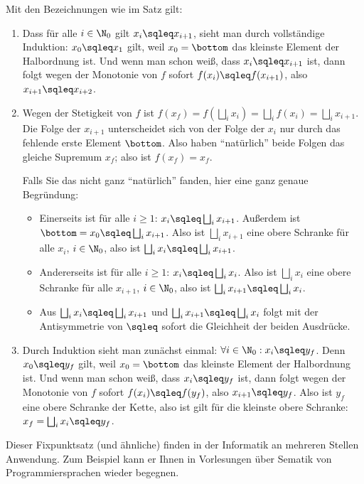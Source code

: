 \begin{beweis}
  Mit den Bezeichnungen wie im Satz gilt:
  \begin{enumerate}
  \item Dass für alle $i\in\N_0$ gilt $x_i\sqleq x_{i+1}$, sieht man
    durch vollständige Induktion: $x_0\sqleq x_1$ gilt, weil
    $x_0=\bottom$ das kleinste Element der Halbordnung ist. Und wenn
    man schon weiß, dass $x_i\sqleq x_{i+1}$ ist, dann folgt wegen der
    Monotonie von $f$ sofort $f(x_i)\sqleq f(x_{i+1})$, also
    $x_{i+1}\sqleq x_{i+2}$.
  \item Wegen der Stetigkeit von $f$ ist $f(x_f)= f(\bigsqcup_i x_i)
    =\bigsqcup_i f(x_i) = \bigsqcup_i x_{i+1}$. Die Folge der $x_{i+1}$
    unterscheidet sich von der Folge der $x_i$ nur durch das fehlende
    erste Element $\bottom$. Also haben "`natürlich"' beide Folgen das
    gleiche Supremum $x_f$; also ist $f(x_f)=x_f$.

    Falls Sie das nicht ganz "`natürlich"' fanden, hier eine ganz
    genaue Begründung:
    \begin{itemize}
    \item Einerseits ist für alle $i\geq 1$: $x_i\sqleq \bigsqcup_i
      x_{i+1}$. Außerdem ist $\bottom=x_0\sqleq \bigsqcup_i
      x_{i+1}$. Also ist $\bigsqcup_i x_{i+1}$ eine obere Schranke für
      alle $x_i$, $i\in\N_0$, also ist $\bigsqcup_i x_i\sqleq
      \bigsqcup_i x_{i+1}$.
    \item Andererseits ist für alle $i\geq 1$: $x_i\sqleq \bigsqcup_i
      x_i$. Also ist $\bigsqcup_i x_i$ eine obere Schranke für alle
      $x_{i+1}$, $i\in\N_0$, also ist $\bigsqcup_i x_{i+1}\sqleq
      \bigsqcup_i x_i$.
    \item Aus $\bigsqcup_i x_i\sqleq \bigsqcup_i x_{i+1}$ und
      $\bigsqcup_i x_{i+1}\sqleq \bigsqcup_i x_i$ folgt mit der
      Antisymmetrie von $\sqleq$ sofort die Gleichheit der beiden
      Ausdrücke.
    \end{itemize}
  \item Durch Induktion sieht man zunächst einmal: $\forall i\in\N_0:
    x_i \sqleq y_f$. Denn $x_0\sqleq y_f$ gilt, weil $x_0=\bottom$ das
    kleinste Element der Halbordnung ist. Und wenn man schon weiß,
    dass $x_i\sqleq y_f$ ist, dann folgt wegen der Monotonie von $f$
    sofort $f(x_i)\sqleq f(y_f)$, also $x_{i+1}\sqleq y_f$. Also ist
    $y_f$ eine obere Schranke der Kette, also ist gilt für die
    kleinste obere Schranke: $x_f=\bigsqcup_i x_i \sqleq y_f$.
  \end{enumerate}
\end{beweis}
%
Dieser Fixpunktsatz (und ähnliche) finden in der Informatik an
mehreren Stellen Anwendung. Zum Beispiel kann er Ihnen in Vorlesungen
über Sematik von Programmiersprachen wieder begegnen.

